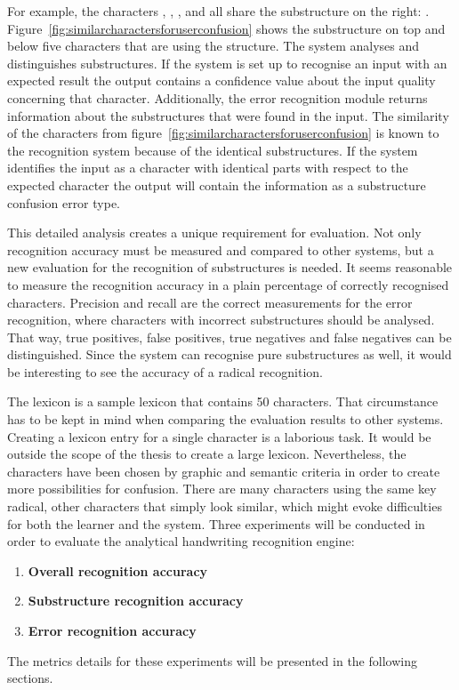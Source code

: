For example, the characters 
, , ,  and  all share the substructure
on the right: .
Figure~\ref{fig:similarcharactersforuserconfusion} shows the
substructure on top and below five characters that are using the structure.
The system analyses and distinguishes substructures. If the system is set
up to recognise an input with an expected result the output contains
a confidence value about the input quality concerning that character.
Additionally, the error recognition module returns information about the
substructures that were found in the input.
The similarity of the characters from 
figure~\ref{fig:similarcharactersforuserconfusion} is known to
the recognition system because of the identical substructures.
If the system identifies the input as a character with identical parts
with respect to the expected character the output will contain the information
as a substructure confusion error type.

This detailed analysis creates a unique requirement for evaluation. Not only
recognition accuracy must be measured and compared to other systems,
but a new evaluation for the recognition of substructures is needed.
It seems reasonable to measure the recognition accuracy in a plain 
percentage of correctly recognised characters. 
Precision and recall are the correct measurements for the error recognition,
where characters with incorrect substructures should be analysed. 
That way, true positives, false positives, 
true negatives and false negatives can be distinguished.
Since the system can recognise pure substructures as well, it would 
be interesting to see the accuracy of a radical recognition.

The lexicon is a sample lexicon that contains 50 characters. That circumstance
has to be kept in mind when comparing the evaluation results to other
systems. Creating a lexicon entry for a single character is a laborious task.
It would be outside the scope of the thesis to create a large lexicon.
Nevertheless, the characters have been chosen by graphic and
semantic criteria in order to create more possibilities for confusion.
There are many characters using the same key radical, other characters
that simply look similar, which might evoke difficulties 
for both the learner and the system.
Three experiments will be conducted in order to evaluate the analytical
handwriting recognition engine:
\begin{enumerate}
  \item \textbf{Overall recognition accuracy} \label{eval:enum:overall}
  \item \textbf{Substructure recognition accuracy} \label{eval:enum:substructure}
  \item \textbf{Error recognition accuracy} \label{eval:enum:errorrecognition}
\end{enumerate}
The metrics details for these experiments will be presented in the following 
sections.

